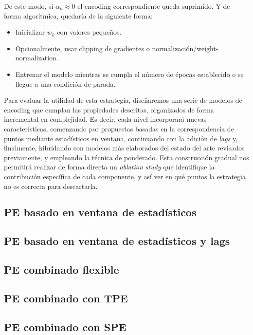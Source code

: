 De este modo, si \(\alpha_k \approx 0\) el encoding correspondiente queda suprimido. Y de forma algorítmica, quedaría de la siguiente forma:
\begin{itemize}
	\item Inicializar \(w_k\) con valores pequeños.
	\item Opcionalmente, usar clipping de gradientes o normalización/weight-normalization.
	\item Entrenar el modelo mientras se cumpla el número de épocas establecido o se llegue a una condición de parada.
\end{itemize}


Para evaluar la utilidad de esta estrategia, diseñaremos una serie de modelos de encoding que cumplan las propiedades descritas, organizados de forma incremental en complejidad. Es decir, cada nivel incorporará nuevas características, comenzando por propuestas basadas en la correspondencia de puntos mediante estadísticos en ventana, continuando con la adición de \textit{lags} y, finalmente, hibridando con modelos más elaborados del estado del arte revisados previamente, y empleando la técnica de ponderado. Esta construcción gradual nos permitirá realizar de forma directa un \textit{ablation study} que identifique la contribución específica de cada componente, y así ver en qué puntos la estrategia no es correcta para descartarla.


\subsection{PE basado en ventana de estadísticos}
\subsection{PE basado en ventana de estadísticos y lags}
\subsection{PE combinado flexible}
\subsection{PE combinado con TPE}
\subsection{PE combinado con SPE}


